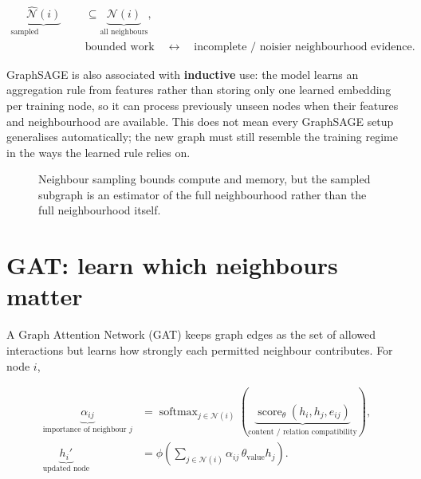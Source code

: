 \[
\begin{aligned}
\underbrace{\widehat{\mathcal N}(i)}_{\text{sampled neighbours}}
&\subseteq
\underbrace{\mathcal N(i)}_{\text{all neighbours}},\\[-1mm]
&\text{bounded work}
\quad\leftrightarrow\quad
\text{incomplete / noisier neighbourhood evidence}.
\end{aligned}
\]

GraphSAGE is also associated with \textbf{inductive} use: the model learns an aggregation rule from features rather than storing only one learned embedding per training node, so it can process previously unseen nodes when their features and neighbourhood are available.
This does not mean every GraphSAGE setup generalises automatically; the new graph must still resemble the training regime in the ways the learned rule relies on.

\begin{figure}[htbp]
\centering
{}
\caption{Neighbour sampling bounds compute and memory, but the sampled subgraph is an estimator of the full neighbourhood rather than the full neighbourhood itself.}
\label{fig:gnn-neighbour-sampling}
\end{figure}

\section{GAT: learn which neighbours matter}
A Graph Attention Network (GAT) keeps graph edges as the set of allowed interactions but learns how strongly each permitted neighbour contributes.
For node $i$,

\[
\begin{aligned}
\underbrace{\alpha_{ij}}_{\text{importance of neighbour }j}
&=
\operatorname{softmax}_{j\in\mathcal N(i)}
\left(
\underbrace{\operatorname{score}_{\theta}(h_i,h_j,e_{ij})}_{\text{content / relation compatibility}}
\right),\\[1mm]
\underbrace{h_i'}_{\text{updated node}}
&=
\phi\!\left(
\sum_{j\in\mathcal N(i)}
\alpha_{ij}\,\theta_{\text{value}}h_j
\right).
\end{aligned}
\]

